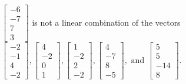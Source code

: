 \begin{exercise}
\begin{exerciseStatement}
  \end{exerciseStatement}
  \begin{exerciseAnswer}
   \(\left[\begin{array}{c}
-6 \\
-7 \\
7 \\
3
\end{array}\right]\) 
  	 is not  
	a linear combination of the vectors \(\left[\begin{array}{c}
-2 \\
-1 \\
4 \\
-2
\end{array}\right] , \left[\begin{array}{c}
4 \\
-2 \\
0 \\
1
\end{array}\right] , \left[\begin{array}{c}
1 \\
-2 \\
2 \\
-2
\end{array}\right] , \left[\begin{array}{c}
4 \\
-7 \\
8 \\
-5
\end{array}\right] , \text{ and } \left[\begin{array}{c}
5 \\
5 \\
-14 \\
8
\end{array}\right]\).

	
  


  \end{exerciseAnswer}
\end{exercise}
